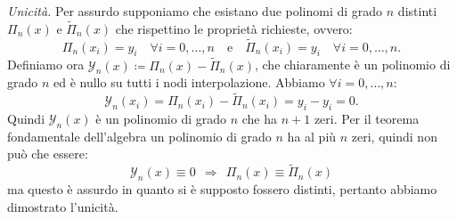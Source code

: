 \textit{Unicità.} Per assurdo supponiamo che esistano due polinomi di grado $n$ distinti $\Pi _{n}(x)$ e $\tilde{\Pi }_{n}(x)$ che rispettino le proprietà richieste, ovvero:
\begin{equation*}
\Pi _{n}( x_{i}) =y_{i} \quad \forall i=0,\dotsc ,n \quad \text{e} \quad \tilde{\Pi }_{n}( x_{i}) =y_{i} \quad \forall i=0,\dotsc ,n.
\end{equation*}
Definiamo ora $\mathcal{Y}_{n}(x) \coloneqq \Pi _{n}(x) -\tilde{\Pi }_{n}(x)$, che chiaramente è un polinomio di grado $n$ ed è nullo su tutti i nodi interpolazione. Abbiamo $\forall i=0,\dotsc ,n$:
$$
	\mathcal{Y}_{n}( x_{i})
	=\Pi _{n}( x_{i}) -\tilde{\Pi }_{n}( x_{i})
	=y_{i} -y_{i}
	=0.
$$
Quindi $\mathcal{Y}_{n}(x)$ è un polinomio di grado $n$ che ha $n+1$ zeri. Per il teorema fondamentale dell'algebra un polinomio di grado $n$ ha al più $n$ zeri, quindi non può che essere:
\begin{equation*}
\mathcal{Y}_{n}(x) \equiv 0\ \ \Rightarrow \ \ \Pi _{n}(x) \equiv \tilde{\Pi }_{n}(x)
\end{equation*}
ma questo è assurdo in quanto si è supposto fossero distinti, pertanto abbiamo dimostrato l'unicità. \textqed

